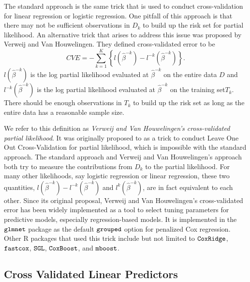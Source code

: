 \par The standard approach is the same trick that is used to conduct cross-validation for linear regression or logistic regression. One pitfall of this approach is that there may not be sufficient observations in $D_k$ to build up the risk set for partial likelihood. An alternative trick that arises to address this issue was proposed by Verweij and Van Houwelingen. They defined cross-validated error to be 
\begin{equation}
\label{eq:VVH}
	CVE = -\sum_{k = 1}^K \left\{ l(\hat{\beta}^{- k})  - l^{-k}(\hat{\beta}^{- k}) \right\}. 
\end{equation}
$l(\hat{\beta}^{-k})$ is the log partial likelihood evaluated at $\hat{\beta}^{-k}$ on the entire data $D$ and $l^{-k}(\hat{\beta}^{-k})$ is the log partial likelihood evaluated at $\hat{\beta}^{-k}$ on the training set$T_k$. There should be enough observations in $T_k$ to build up the risk set as long as the entire data has a reasonable sample size. 

\par We refer to this definition as \emph{Verweij and Van Houwelingen's cross-validated partial likelihood}. It was originally proposed to as a trick to conduct Leave One Out Cross-Validation for partial likelihood, which is impossible with the standard approach. The standard approach and Verweij and Van Houwelingen's approach both try to measure the contributions from $D_k$ to the partial likelihood. For many other likelihoods, say logistic regression or linear regression, these two quantities, $l(\hat{\beta}^{- k})  - l^{-k}(\hat{\beta}^{- k})$ and  $l^{k}(\hat{\beta}^{-k})$, are in fact equivalent to each other. Since its original proposal, Verweij and Van Houwelingen's cross-validated error has been widely implemented as a tool to select tuning parameters for predictive models, especially regression-based models. It is implemented in the $\tt{glmnet}$ package as the default $\tt{grouped}$ option for penalized Cox regression. Other R packages that used this trick include but not limited to $\tt{CoxRidge}$, $\tt{fastcox}$, $\tt{SGL}$, $\tt{CoxBoost}$, and $\tt{mboost}$. 

  \subsection{Cross Validated Linear Predictors}

